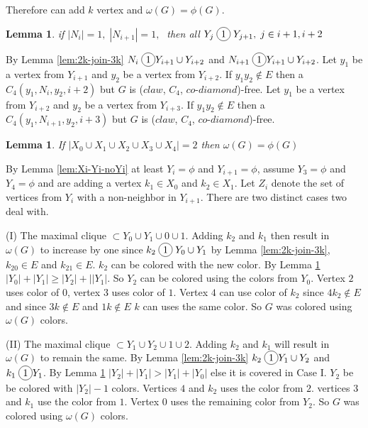 \documentclass[12pt]{article}
\newcommand*\circled[1]{\tikz[baseline=(char.base)]{
            \node[shape=circle,draw,inner sep=2pt] (char) {#1};}}
\newtheorem{Lemma}[Theorem]{Lemma}
\def\CCD{($claw$, $C_4$, $co$-$diamond$)}
\begin{document}
{Therefore can add $k$ vertex and $\omega(G) = \phi(G)$.

\begin{Lemma}\label{lem:2-xi-2yi-join}
if $|N_i| = 1,\; |N_{i+1}| = 1,\;$ then all $Y_j \;\circled{1}\; Y_{j+1},\; j \in {i+1, i+2}$
\end{Lemma}
 By Lemma \ref{lem:2k-join-3k} $N_i \;\circled{1} Y_{i+1} \cup Y_{i+2}$ and $N_{i+1} \;\circled{1} Y_{i+1} \cup Y_{i+2}$. Let $y_1$ be a vertex from $Y_{i+1}$ and $y_2$ be a vertex from $Y_{i+2}$. If $y_1y_2 \not \in E$ then a $C_4 (y_1,N_i,y_2, i+2)$ but $G$ is {\CCD}-free. Let $y_1$ be a vertex from $Y_{i+2}$ and $y_2$ be a vertex from $Y_{i+3}$. If $y_1y_2 \not \in E$ then a $C_4 (y_1,N_{i+1},y_2, i+3)$ but $G$ is {\CCD}-free.


\begin{Lemma}\label{lem:add-two-2vertex}
If $|X_0 \cup X_1 \cup X_2 \cup X_3 \cup X_4| = 2$ then $\omega(G) =  \phi(G)$
\end{Lemma}
By Lemma \ref{lem:Xi-Yi-noYi} at least $Y_i = \phi$ and $Y_{i+1} = \phi$, assume $Y_3 = \phi$ and $Y_4 = \phi$ and are adding a vertex $k_1 \in X_0$ and $k_2 \in X_1$. Let $Z_i$ denote the set of vertices from $Y_i$ with a non-neighbor in $Y_{i+1}$. There are two distinct cases two deal with.

(I) The maximal clique $\subset Y_0 \cup Y_1 \cup 0 \cup 1$. Adding $k_2$ and $k_1$ then result in $\omega(G)$ to increase by one since $k_2 \;\circled{1}\; Y_0 \cup Y_1$ by Lemma \ref{lem:2k-join-3k}, $k_20 \in E$ and $k_21 \in E$. $k_2$ can be colored with the new color. By Lemma \ref{lem:2-xi-2yi-join}  $|Y_0| + |Y_1| \geq |Y_2| +|  |Y_1|$. So $Y_2$ can be colored using the colors from $Y_0$. Vertex $2$ uses color of $0$, vertex $3$ uses color of $1$. Vertex $4$ can use color of $k_2$ since $4k_2 \not \in E$ and since $3k \not \in E$ and $1k \not \in E$ $k$ can uses the same color. So $G$ was colored using $\omega(G)$ colors.

(II) The maximal clique $\subset Y_1 \cup Y_2 \cup 1 \cup 2$. Adding $k_2$ and $k_1$ will result in $\omega(G)$ to remain the same. By Lemma \ref{lem:2k-join-3k} $k_2 \;\circled{1} Y_1 \cup Y_2$ and $k_1 \;\circled{1} Y_1$. By Lemma \ref{lem:2-xi-2yi-join} $|Y_2| + |Y_1| > |Y_1| + |Y_0|$ else it is covered in Case I. $Y_2$ be be colored with $|Y_2| - 1$ colors. Vertices $4$ and $k_2$ uses the color from $2$. vertices $3$ and $k_1$ use the color from $1$. Vertex $0$ uses the remaining color from $Y_2$. So $G$ was colored using $\omega(G)$ colors.



}
\end{document}
